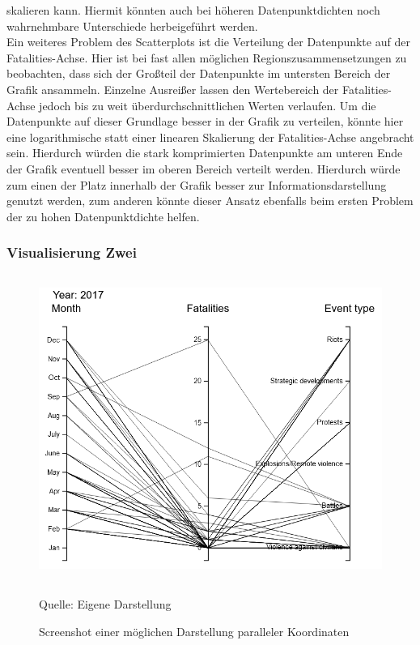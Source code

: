 \documentclass[usegeometry=true]{scrartcl}
\begin{document}
skalieren kann. Hiermit könnten auch bei höheren Datenpunktdichten noch wahrnehmbare Unterschiede herbeigeführt werden.\\ Ein weiteres Problem des Scatterplots ist die Verteilung der Datenpunkte auf der Fatalities-Achse. Hier ist bei fast allen möglichen Regionszusammensetzungen zu beobachten, dass sich der Großteil der Datenpunkte im untersten Bereich der Grafik ansammeln. Einzelne Ausreißer lassen den Wertebereich der Fatalities-Achse jedoch bis zu weit überdurchschnittlichen Werten verlaufen. Um die Datenpunkte auf dieser Grundlage besser in der Grafik zu verteilen, könnte hier eine logarithmische statt einer linearen Skalierung der Fatalities-Achse angebracht sein. Hierdurch würden die stark komprimierten Datenpunkte am unteren Ende der Grafik eventuell besser im oberen Bereich verteilt werden. Hierdurch würde zum einen der Platz innerhalb der Grafik besser zur Informationsdarstellung genutzt werden, zum anderen könnte dieser Ansatz ebenfalls beim ersten Problem der zu hohen Datenpunktdichte helfen.\\

\subsubsection{Visualisierung Zwei}

\begin{figure}[]
\begin{center}
\includegraphics[width=12cm,height=10cm,keepaspectratio]{ParalleleKoordinaten.PNG}%
\caption{Screenshot einer möglichen Darstellung paralleler Koordinaten}
Quelle: Eigene Darstellung
\label{parallelCoordinates}
\end{center}
\end{figure}
\end{document}

